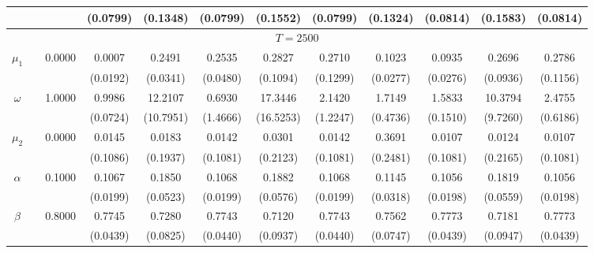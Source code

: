 {\begin{sidewaystable}
\begin{tabular}{cc cc| cccc| cccc}
 &&   & (0.0799) & (0.1348) & (0.0799) & (0.1552) & (0.0799) &(0.1324) & (0.0814) & (0.1583) & (0.0814)  \\ 
\hline 
\multicolumn{12}{c}{$T =2500$}  \\ 
\hline 
 \rowcolor{LightCyan} 
$\mu_{1}$&& 0.0000 & 0.0007 & 0.2491 & 0.2535 & 0.2827 & 0.2710 & 0.1023 & 0.0935 & 0.2696 & 0.2786  \\   
  &&   & (0.0192) & (0.0341) & (0.0480) & (0.1094) & (0.1299) &(0.0277) & (0.0276) & (0.0936) & (0.1156)  \\ 
\rowcolor{LightCyan} 
$\omega$&& 1.0000 & 0.9986 & 12.2107 & 0.6930 & 17.3446 & 2.1420 & 1.7149 & 1.5833 & 10.3794 & 2.4755  \\   
  &&   & (0.0724) & (10.7951) & (1.4666) & (16.5253) & (1.2247) &(0.4736) & (0.1510) & (9.7260) & (0.6186)  \\ 
\rowcolor{LightCyan} 
$\mu_{2}$&& 0.0000 & 0.0145 & 0.0183 & 0.0142 & 0.0301 & 0.0142 & 0.3691 & 0.0107 & 0.0124 & 0.0107  \\   
  &&   & (0.1086) & (0.1937) & (0.1081) & (0.2123) & (0.1081) &(0.2481) & (0.1081) & (0.2165) & (0.1081)  \\ 
 \rowcolor{LightCyan} 
$\alpha$&& 0.1000 & 0.1067 & 0.1850 & 0.1068 & 0.1882 & 0.1068 & 0.1145 & 0.1056 & 0.1819 & 0.1056  \\   
  &&   & (0.0199) & (0.0523) & (0.0199) & (0.0576) & (0.0199) &(0.0318) & (0.0198) & (0.0559) & (0.0198)  \\ 
 \rowcolor{LightCyan} 
$\beta$&& 0.8000 & 0.7745 & 0.7280 & 0.7743 & 0.7120 & 0.7743 & 0.7562 & 0.7773 & 0.7181 & 0.7773  \\   
  &&   & (0.0439) & (0.0825) & (0.0440) & (0.0937) & (0.0440) &(0.0747) & (0.0439) & (0.0947) & (0.0439)  \\ 

\end{tabular}
\end{sidewaystable}}
